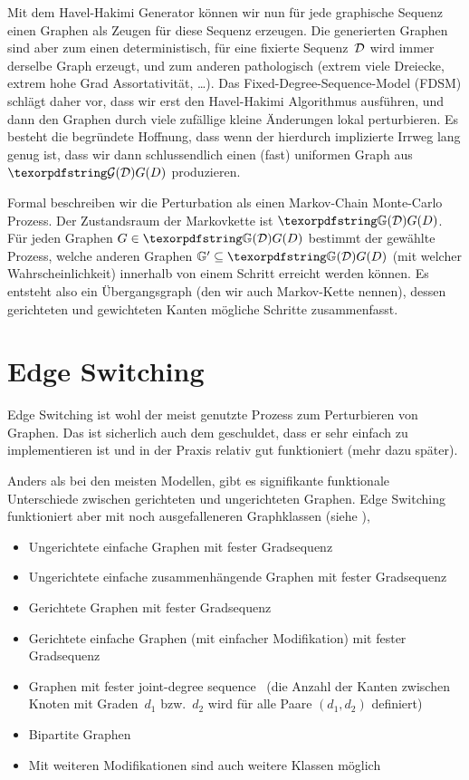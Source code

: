 Mit dem Havel-Hakimi Generator können wir nun für jede graphische Sequenz einen Graphen als Zeugen für diese Sequenz erzeugen.
Die generierten Graphen sind aber zum einen deterministisch, \dh für eine fixierte Sequenz~$\mathcal{D}$ wird immer derselbe Graph erzeugt, und zum anderen pathologisch (extrem viele Dreiecke, extrem hohe Grad Assortativität, \ldots).
Das Fixed-Degree-Sequence-Model (FDSM) schlägt daher vor, dass wir erst den Havel-Hakimi Algorithmus ausführen, und dann den Graphen durch viele zufällige kleine Änderungen lokal perturbieren.
Es besteht die begründete Hoffnung, dass wenn der hierdurch implizierte Irrweg lang genug ist, dass wir dann schlussendlich einen (fast) uniformen Graph aus $\Gd$ produzieren.

Formal beschreiben wir die Perturbation als einen Markov-Chain Monte-Carlo Prozess.
Der Zustandsraum der Markovkette ist $\gd$.
Für jeden Graphen $G \in \gd$ bestimmt der gewählte Prozess, welche anderen Graphen $\mathbb G' \subseteq \gd$ (mit welcher Wahrscheinlichkeit) innerhalb von einem Schritt erreicht werden können.
Es entsteht also ein  Übergangsgraph (den wir auch Markov-Kette nennen), dessen gerichteten und gewichteten Kanten mögliche Schritte zusammenfasst.

\section{Edge Switching}
Edge Switching ist wohl der meist genutzte Prozess zum Perturbieren von Graphen.
Das ist sicherlich auch dem geschuldet, dass er sehr einfach zu implementieren ist und in der Praxis relativ gut funktioniert (mehr dazu später).

Anders als bei den meisten Modellen, gibt es signifikante funktionale Unterschiede zwischen gerichteten und ungerichteten Graphen.
Edge Switching funktioniert aber mit noch ausgefalleneren Graphklassen (siehe \zB \cite{carstens_2017}), \zB
\begin{itemize}
    \item Ungerichtete einfache Graphen mit fester Gradsequenz
    \item Ungerichtete einfache zusammenhängende Graphen  mit fester Gradsequenz \cite{DBLP:journals/compnet/VigerL16}
    \item Gerichtete Graphen  mit fester Gradsequenz
    \item Gerichtete einfache Graphen (mit einfacher Modifikation)  mit fester Gradsequenz
    \item Graphen mit fester joint-degree sequence~\cite{DBLP:conf/alenex/StantonP11} (\dh die Anzahl der Kanten zwischen Knoten mit Graden~$d_1$ bzw.~$d_2$ wird für alle Paare $(d_1, d_2)$ definiert)
    \item Bipartite Graphen
    \item Mit weiteren Modifikationen sind auch weitere Klassen möglich
\end{itemize}


